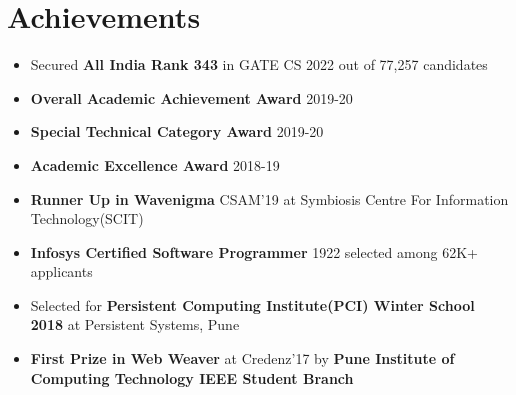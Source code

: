 \documentclass[10.8pt, a4paper]{extarticle}
\newcommand{\shorterSection}[1]{\vspace{-10pt}\section{#1}}
\begin{document}
\shorterSection{Achievements}
\begin{itemize}
  \item Secured \textbf{All India Rank 343} in GATE CS 2022 out of 77,257 candidates\\[-0.6cm]
  \item \textbf{Overall Academic Achievement Award} 2019-20\\[-0.6cm]
  \item \textbf{Special Technical Category Award} 2019-20\\[-0.6cm]
  \item \textbf{Academic Excellence Award} 2018-19\\[-0.6cm]
  \item \textbf{Runner Up in Wavenigma} CSAM'19 at Symbiosis Centre For Information Technology(SCIT) \\[-0.6cm]
  \item \textbf{Infosys Certified Software Programmer} 1922 selected among 62K+ applicants\\[-0.6cm]
  \item Selected for \textbf{Persistent Computing Institute(PCI) Winter School 2018} at Persistent Systems, Pune\\[-0.6cm]
  \item \textbf{First Prize in Web Weaver} at Credenz'17 by \textbf{Pune Institute of Computing Technology IEEE Student Branch}\\[-0.6cm]
\end{itemize}
\end{document}

